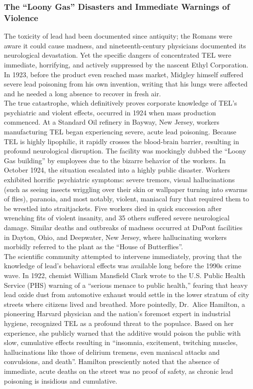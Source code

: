 \documentclass[
]{article}
\begin{document}
\subsubsection{\texorpdfstring{\textbf{The ``Loony Gas'' Disasters and
Immediate Warnings of
Violence}}{The ``Loony Gas'' Disasters and Immediate Warnings of Violence}}\label{the-loony-gas-disasters-and-immediate-warnings-of-violence}

The toxicity of lead had been documented since antiquity; the Romans
were aware it could cause madness, and nineteenth-century physicians
documented its neurological devastation. Yet the specific dangers of
concentrated TEL were immediate, horrifying, and actively suppressed by
the nascent Ethyl Corporation. In 1923, before the product even reached
mass market, Midgley himself suffered severe lead poisoning from his own
invention, writing that his lungs were affected and he needed a long
absence to recover in fresh air.\\
The true catastrophe, which definitively proves corporate knowledge of
TEL's psychiatric and violent effects, occurred in 1924 when mass
production commenced. At a Standard Oil refinery in Bayway, New Jersey,
workers manufacturing TEL began experiencing severe, acute lead
poisoning. Because TEL is highly lipophilic, it rapidly crosses the
blood-brain barrier, resulting in profound neurological disruption. The
facility was mockingly dubbed the ``Loony Gas building'' by employees
due to the bizarre behavior of the workers. In October 1924, the
situation escalated into a highly public disaster. Workers exhibited
horrific psychiatric symptoms: severe tremors, visual hallucinations
(such as seeing insects wriggling over their skin or wallpaper turning
into swarms of flies), paranoia, and most notably, violent, maniacal
fury that required them to be wrestled into straitjackets. Five workers
died in quick succession after wrenching fits of violent insanity, and
35 others suffered severe neurological damage. Similar deaths and
outbreaks of madness occurred at DuPont facilities in Dayton, Ohio, and
Deepwater, New Jersey, where hallucinating workers morbidly referred to
the plant as the ``House of Butterflies''.\\
The scientific community attempted to intervene immediately, proving
that the knowledge of lead's behavioral effects was available long
before the 1990s crime wave. In 1922, chemist William Mansfield Clark
wrote to the U.S. Public Health Service (PHS) warning of a ``serious
menace to public health,'' fearing that heavy lead oxide dust from
automotive exhaust would settle in the lower stratum of city streets
where citizens lived and breathed. More pointedly, Dr.~Alice Hamilton, a
pioneering Harvard physician and the nation's foremost expert in
industrial hygiene, recognized TEL as a profound threat to the populace.
Based on her experience, she publicly warned that the additive would
poison the public with slow, cumulative effects resulting in ``insomnia,
excitement, twitching muscles, hallucinations like those of delirium
tremens, even maniacal attacks and convulsions, and death''. Hamilton
presciently noted that the absence of immediate, acute deaths on the
street was no proof of safety, as chronic lead poisoning is insidious
and cumulative.
\end{document}
